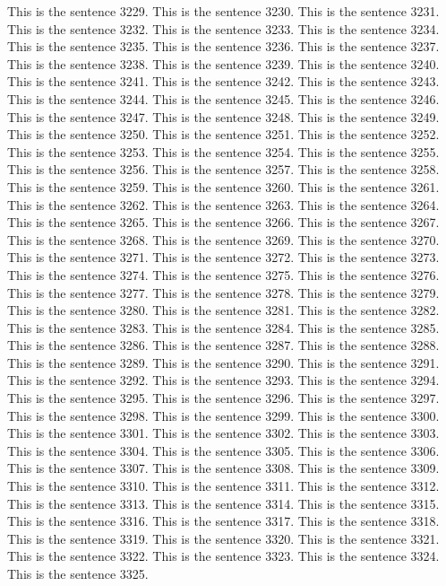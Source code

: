 \documentclass{article}
\begin{document}
This is the sentence 3229.
This is the sentence 3230.
This is the sentence 3231.
This is the sentence 3232.
This is the sentence 3233.
This is the sentence 3234.
This is the sentence 3235.
This is the sentence 3236.
This is the sentence 3237.
This is the sentence 3238.
This is the sentence 3239.
This is the sentence 3240.
This is the sentence 3241.
This is the sentence 3242.
This is the sentence 3243.
This is the sentence 3244.
This is the sentence 3245.
This is the sentence 3246.
This is the sentence 3247.
This is the sentence 3248.
This is the sentence 3249.
This is the sentence 3250.
This is the sentence 3251.
This is the sentence 3252.
This is the sentence 3253.
This is the sentence 3254.
This is the sentence 3255.
This is the sentence 3256.
This is the sentence 3257.
This is the sentence 3258.
This is the sentence 3259.
This is the sentence 3260.
This is the sentence 3261.
This is the sentence 3262.
This is the sentence 3263.
This is the sentence 3264.
This is the sentence 3265.
This is the sentence 3266.
This is the sentence 3267.
This is the sentence 3268.
This is the sentence 3269.
This is the sentence 3270.
This is the sentence 3271.
This is the sentence 3272.
This is the sentence 3273.
This is the sentence 3274.
This is the sentence 3275.
This is the sentence 3276.
This is the sentence 3277.
This is the sentence 3278.
This is the sentence 3279.
This is the sentence 3280.
This is the sentence 3281.
This is the sentence 3282.
This is the sentence 3283.
This is the sentence 3284.
This is the sentence 3285.
This is the sentence 3286.
This is the sentence 3287.
This is the sentence 3288.
This is the sentence 3289.
This is the sentence 3290.
This is the sentence 3291.
This is the sentence 3292.
This is the sentence 3293.
This is the sentence 3294.
This is the sentence 3295.
This is the sentence 3296.
This is the sentence 3297.
This is the sentence 3298.
This is the sentence 3299.
This is the sentence 3300.
This is the sentence 3301.
This is the sentence 3302.
This is the sentence 3303.
This is the sentence 3304.
This is the sentence 3305.
This is the sentence 3306.
This is the sentence 3307.
This is the sentence 3308.
This is the sentence 3309.
This is the sentence 3310.
This is the sentence 3311.
This is the sentence 3312.
This is the sentence 3313.
This is the sentence 3314.
This is the sentence 3315.
This is the sentence 3316.
This is the sentence 3317.
This is the sentence 3318.
This is the sentence 3319.
This is the sentence 3320.
This is the sentence 3321.
This is the sentence 3322.
This is the sentence 3323.
This is the sentence 3324.
This is the sentence 3325.
\end{document}
